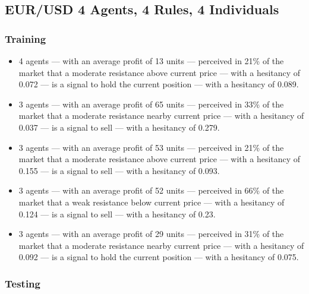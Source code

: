 \subsection{EUR/USD 4 Agents, 4 Rules, 4 Individuals}
\label{}

\subsubsection{Training}
\label{}

{\scriptsize
  \begin{itemize}
  \item 4 agents — with an average profit of 13 units — perceived in 21\% of the
    market that a moderate resistance above current price — with a hesitancy of
    0.072 — is a signal to hold the current position — with a hesitancy of
    0.089.
  \item 3 agents — with an average profit of 65 units — perceived in 33\% of the
    market that a moderate resistance nearby current price — with a hesitancy of
    0.037 — is a signal to sell — with a hesitancy of 0.279.
  \item 3 agents — with an average profit of 53 units — perceived in 21\% of the
    market that a moderate resistance above current price — with a hesitancy of
    0.155 — is a signal to sell — with a hesitancy of 0.093.
  \item 3 agents — with an average profit of 52 units — perceived in 66\% of the
    market that a weak resistance below current price — with a hesitancy of
    0.124 — is a signal to sell — with a hesitancy of 0.23.
  \item 3 agents — with an average profit of 29 units — perceived in 31\% of the
    market that a moderate resistance nearby current price — with a hesitancy of
    0.092 — is a signal to hold the current position — with a hesitancy of
    0.075.
  \end{itemize}
}

\subsubsection{Testing}
\label{}

